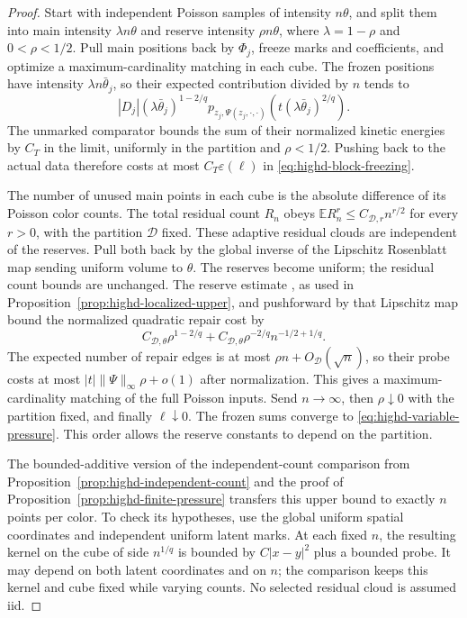 \documentclass[11pt,reqno]{amsart}
\theoremstyle{definition}
\theoremstyle{remark}
\numberwithin{equation}{section}
\newcommand{\E}{\mathbb E}
\begin{document}
\begin{proof}
Start with independent Poisson samples of intensity \(n\theta\), and
split them into main intensity \(\lambda n\theta\) and reserve intensity
\(\rho n\theta\), where \(\lambda=1-\rho\) and \(0<\rho<1/2\).
Pull main positions back by \(\Phi_j\), freeze marks and coefficients,
and optimize a maximum-cardinality matching in each cube. The frozen
positions have intensity \(\lambda n\bar\theta_j\), so their expected
contribution divided by \(n\) tends to
\[
 |D_j|(\lambda\bar\theta_j)^{1-2/q}
       p_{z_j,\Psi(z_j,\cdot,\cdot)}
                         (t(\lambda\bar\theta_j)^{2/q}).
\]
The unmarked comparator bounds the sum of their normalized kinetic
energies by \(C_T\) in the limit, uniformly in the partition and
\(\rho<1/2\). Pushing back to the actual data therefore costs at most
\(C_T\varepsilon(\ell)\) in \eqref{eq:highd-block-freezing}.

The number of unused main points in each cube is the absolute difference
of its Poisson color counts. The total residual count \(R_n\) obeys
\(\E R_n^r\le C_{\mathcal D,r}n^{r/2}\) for every \(r>0\), with
the partition \(\mathcal D\) fixed. These adaptive residual clouds
are independent of the reserves. Pull both back by the global inverse
of the Lipschitz Rosenblatt map sending uniform volume to \(\theta\).
The reserves become uniform; the residual count bounds are unchanged.
The reserve estimate \cite[Proposition~6.3]{GoldmanTrevisan2023}, as
used in Proposition~\ref{prop:highd-localized-upper}, and pushforward
by that Lipschitz map bound the normalized quadratic repair cost by
\[
 C_{\mathcal D,\theta}\rho^{1-2/q}
       +C_{\mathcal D,\theta}\rho^{-2/q}n^{-1/2+1/q}.
\]
The expected number of repair edges is at most
\(\rho n+O_{\mathcal D}(\sqrt n)\), so their probe costs at most
\(|t|\|\Psi\|_\infty\rho+o(1)\) after normalization.
This gives a maximum-cardinality matching of the full Poisson inputs.
Send \(n\to\infty\), then \(\rho\downarrow0\) with the partition
fixed, and finally \(\ell\downarrow0\). The frozen sums converge to
\eqref{eq:highd-variable-pressure}. This order allows the reserve
constants to depend on the partition.

The bounded-additive version of the independent-count comparison
from Proposition~\ref{prop:highd-independent-count} and the proof of
Proposition~\ref{prop:highd-finite-pressure} transfers this upper bound
to exactly \(n\) points per color. To check its hypotheses, use the
global uniform spatial coordinates and independent uniform latent
marks. At each fixed \(n\), the resulting
kernel on the cube of side \(n^{1/q}\) is bounded by \(C|x-y|^2\)
plus a bounded probe. It may depend on both latent coordinates and
on \(n\); the comparison keeps this kernel and cube fixed while
varying counts. No selected residual cloud is assumed iid.


\end{proof}
\end{document}
